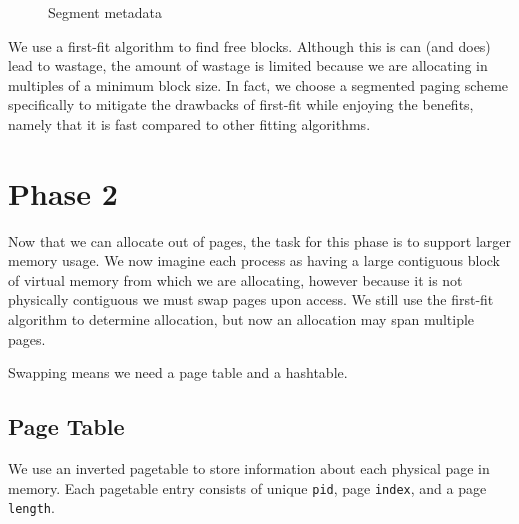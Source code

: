 \documentclass{article}
\begin{document}
\begin{figure}
\centering
{}
\caption{Segment metadata}
\label{fig:segment_metadata}
\end{figure}

We use a first-fit algorithm to find free blocks. Although this is can (and does) lead to wastage, the amount of wastage is limited because we are allocating in multiples of a minimum block size. In fact, we choose a segmented paging scheme specifically to mitigate the drawbacks of first-fit while enjoying the benefits, namely that it is fast compared to other fitting algorithms.

\section{Phase 2}
Now that we can allocate out of pages, the task for this phase is to support larger memory usage. We now imagine each process as having a large contiguous block of virtual memory from which we are allocating, however because it is not physically contiguous we must swap pages upon access. We still use the first-fit algorithm to determine allocation, but now an allocation may span multiple pages. 

Swapping means we need a page table and a hashtable. 

\subsection{Page Table}
We use an inverted pagetable to store information about each physical page in memory. Each pagetable entry consists of unique \texttt{pid}, page \texttt{index}, and a page \texttt{length}.
\end{document}
